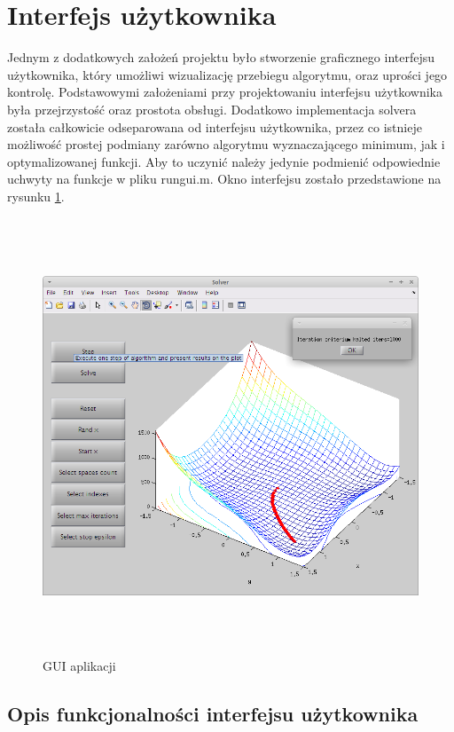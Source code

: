 \documentclass[12pt]{article}
\begin{document}
\section*{Interfejs użytkownika}

Jednym z dodatkowych założeń projektu było stworzenie graficznego interfejsu
użytkownika, który umożliwi wizualizację przebiegu algorytmu, oraz uprości jego
kontrolę. Podstawowymi założeniami przy projektowaniu interfejsu użytkownika
była przejrzystość oraz prostota obsługi. Dodatkowo implementacja solvera
została całkowicie odseparowana od interfejsu użytkownika, przez co istnieje
możliwość prostej podmiany zarówno algorytmu wyznaczającego minimum, jak
i optymalizowanej funkcji. Aby to uczynić należy jedynie podmienić odpowiednie
uchwyty na funkcje w pliku rungui.m. Okno interfejsu zostało przedstawione
na rysunku \ref{img:gui1}.

\begin{figure}[!htb]
    \begin{center}
        \includegraphics[height=13cm]{../res/img/gui_snap_solve.png}
    \end{center}
    \caption{GUI aplikacji}\label{img:gui1}
\end{figure}

\newpage

\subsection{Opis funkcjonalności interfejsu użytkownika}
\end{document}
